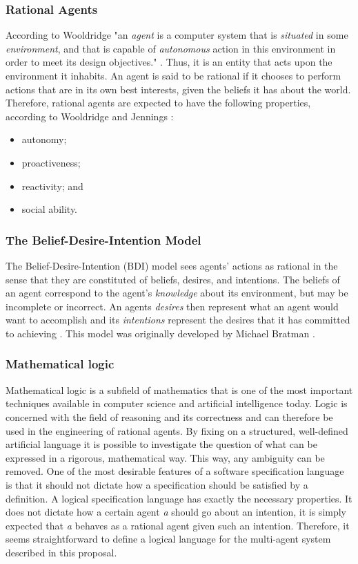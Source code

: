 \documentclass{sig-alternate-br}
\begin{document}
\subsubsection{Rational Agents}
According to Wooldridge "an {\it agent} is a computer system that is {\it situated} in some {\it environment}, and that is capable of {\it autonomous} action in this environment in order to meet its design objectives." \cite{b:mas}. Thus, it is an entity that acts upon the environment it inhabits. An agent is said to be rational if it chooses to perform actions that are in its own best interests, given the beliefs it has about the world. Therefore, rational agents are expected to have the following properties, according to Wooldridge and Jennings \cite{b:rara}:
\begin{itemize}
\item autonomy;
\item proactiveness;
\item reactivity; and
\item social ability.
\end{itemize}
\subsubsection{The Belief-Desire-Intention Model}
The Belief-Desire-Intention (BDI) model sees agents' actions as rational in the sense that they are constituted of beliefs, desires, and intentions. The beliefs of an agent correspond to the agent's {\it knowledge} about its environment, but may be incomplete or incorrect. An agents {\it desires} then represent what an agent would want to accomplish and its {\it intentions} represent the desires that it has committed to achieving \cite{b:rara}. This model was originally developed by Michael Bratman \cite{b:ippr}.
\subsubsection{Mathematical logic}
Mathematical logic is a subfield of mathematics that is one of the most important techniques available in computer science and artificial intelligence today. Logic is concerned with the field of reasoning and its correctness and can therefore be used in the engineering of rational agents.  By fixing on a structured, well-defined artificial language it is possible to investigate the question of what can be expressed in a rigorous, mathematical way. This way, any ambiguity can be removed. One of the most desirable features of a software specification language is that it should not dictate how a specification should be satisfied by a definition. A logical specification language has exactly the necessary properties. It does not dictate how a certain agent {\it a} should go about an intention, it is simply expected that {\it a} behaves as a rational agent given such an intention. Therefore, it seems straightforward to define a logical language for the multi-agent system described in this proposal.
\end{document}
